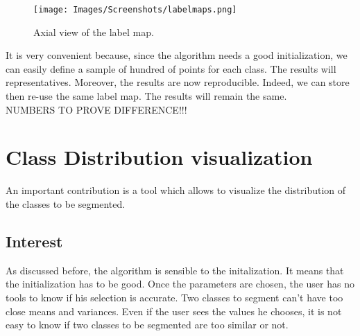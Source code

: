 \begin{figure}\centering
  \texttt{[image: Images/Screenshots/labelmaps.png]}
  \caption{Axial view of the label map.}\label{fig:labelmaps}
\end{figure}

\par 
It is very convenient because, since the algorithm needs a good initialization, we can easily define a sample of hundred of points for each class. The results will representatives. Moreover, the results are now reproducible. Indeed, we can store then re-use the same label map. The results will remain the same.
\\
NUMBERS TO PROVE DIFFERENCE!!!

%
\section{Class Distribution visualization}\label{sec:tables}

An important contribution is a tool which allows to visualize the distribution of the classes to be segmented.
\subsection{Interest}
As discussed before, the algorithm is sensible to the initalization. It means that the initialization has to be good. Once the parameters are chosen, the user has no tools to know if his selection is accurate. Two classes to segment can't have too close means and variances. Even if the user sees the values he chooses, it is not easy to know if two classes to be segmented are too similar or not.
